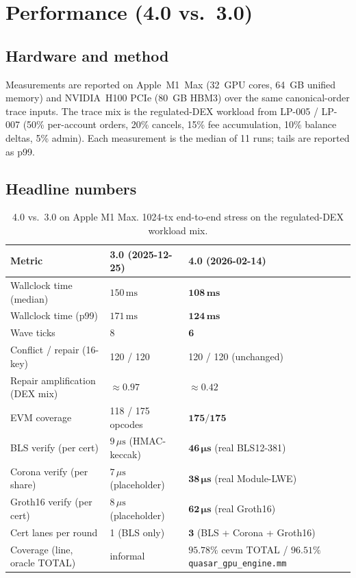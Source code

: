 \section{Performance (4.0 vs.\ 3.0)}

\label{sec:performance}

\subsection{Hardware and method}

Measurements are reported on Apple~M1~Max (32~GPU cores, 64~GB unified
memory) and NVIDIA~H100 PCIe (80~GB HBM3) over the same canonical-order
trace inputs. The trace mix is the regulated-DEX workload from
LP-005 / LP-007 (50\% per-account orders, 20\% cancels, 15\% fee
accumulation, 10\% balance deltas, 5\% admin). Each measurement is
the median of 11 runs; tails are reported as p99.

\subsection{Headline numbers}

\begin{table}[ht]
\centering
\small
\caption{4.0 vs.\ 3.0 on Apple M1 Max. 1024-tx end-to-end stress on
the regulated-DEX workload mix.}
\label{tab:perf}
\begin{tabular}{lll}
\toprule
\textbf{Metric} & \textbf{3.0 (2025-12-25)} & \textbf{4.0 (2026-02-14)} \\
\midrule
Wallclock time (median)        & $150\,\text{ms}$ & $\mathbf{108\,\text{ms}}$ \\
Wallclock time (p99)           & $171\,\text{ms}$ & $\mathbf{124\,\text{ms}}$ \\
Wave ticks                     & 8 & $\mathbf{6}$ \\
Conflict / repair (16-key)     & 120 / 120 & 120 / 120 (unchanged) \\
Repair amplification (DEX mix) & $\approx 0.97$ & $\mathbf{\approx 0.42}$ \\
EVM coverage                   & 118 / 175 opcodes & $\mathbf{175 / 175}$ \\
BLS verify (per cert)          & $9\,\mu\text{s}$ (HMAC-keccak) & $\mathbf{46\,\mu\text{s}}$ (real BLS12-381) \\
Corona verify (per share)    & $7\,\mu\text{s}$ (placeholder) & $\mathbf{38\,\mu\text{s}}$ (real Module-LWE) \\
Groth16 verify (per cert)      & $8\,\mu\text{s}$ (placeholder) & $\mathbf{62\,\mu\text{s}}$ (real Groth16) \\
Cert lanes per round           & 1 (BLS only) & $\mathbf{3}$ (BLS + Corona + Groth16) \\
Coverage (line, oracle TOTAL)  & informal & $\mathbf{95.78\%}$ cevm TOTAL / $\mathbf{96.51\%}$ \texttt{quasar\_gpu\_engine.mm} \\
\bottomrule
\end{tabular}
\end{table}

